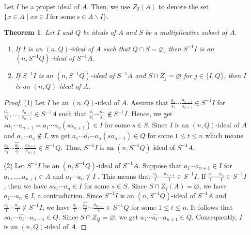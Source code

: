 \documentclass[10pt,a4paper]{amsart}
\newtheorem{theorem}{Theorem}[section]
\numberwithin{equation}{section}
\begin{document}
Let     $I$ be a proper ideal of $A$.  Then, we  use $Z_I(A)$ to denote  the set $\{x \in A \mid xs \in I \  \text{for some} \ s \in A \backslash I\}$.
 \begin{theorem} \label{5}
Let $I$ and $Q$ be ideals of $A$ and $S$ be a multiplicative subset of $A$. 
\begin{enumerate}
\item If $I$ is an $(n,Q)$-ideal of $A$ such that  $Q \cap S=\varnothing$, then $S^{-1}I$ is an $(n,S^{-1}Q)$-ideal of $S^{-1}A$.
\item If $S^{-1}I$ is  an $(n,S^{-1}Q)$-ideal of $S^{-1}A$ and $S \cap Z_j=\varnothing$ for $j \in\{I,Q\}$, then $I$ is an $(n,Q)$-ideal of $A$.
\end{enumerate} 
\end{theorem}
\begin{proof}
(1) Let $I$ be an $(n,Q)$-ideal of $A$. Assume that $  \frac{a
_1}{s_1}\cdots\frac{a_{n+1}}{s_{n+1}} \in S^{-1}I$ for  $ \frac{a
_1}{s_1},\ldots,\frac{a_{n+1}}{s_{n+1}} \in S^{-1}A$ such that $  \frac{a_1}{s_1}\cdots\frac{a_n}{s_n} \notin S^{-1}I$. Hence, we get $ sa_1\cdots a_{n+1}=a_1\cdots a_n(sa_{n+1}) \in I$ for some $s \in S$. Since $I$ is an $(n,Q)$-ideal  of $A$ and $a_1\cdots a_n \notin I$, we get $a_1\cdots \widehat{a_t} \cdots a_n (sa_{n+1})\in Q$ for some $1 \leq t \leq n$ which means  $ \frac{a
_1}{s_1}\cdots \widehat{\frac{a_t}{s_t}} \cdots \frac{a_{n+1}}{s_{n+1}} \in S^{-1}Q$. Thus,  $S^{-1}I$ is an $(n,S^{-1}Q)$-ideal of $S^{-1}A$.

(2) Let  $S^{-1}I$ be an $(n,S^{-1}Q)$-ideal of $S^{-1}A$. Suppose that $  a_1 \cdots a_{n+1} \in I$ for $a_1, \ldots, a_{n+1} \in A$ and $  a_1 \cdots a_n \notin I$ . This means that $\frac{a_1}{1} \cdots \frac{a_{n+1}}{1} \in S^{-1}I$. If $\frac{a_1}{1} \cdots \frac{a_n}{1} \in S^{-1}I$, then we have $sa_1\cdots a_n \in I$ for some $s \in S$. Since  $S \cap Z_I(A)=\varnothing$, we have  $a_1\cdots a_n \in I$, a contradiction. Since $S^{-1}I$ is an $(n,S^{-1}Q)$-ideal of $S^{-1}A$ and $\frac{a_1}{1} \cdots \frac{a_n}{1} \notin S^{-1}I$, we have $\frac{a_1}{1} \cdots \widehat{\frac{a_t}{1}} \cdots  \frac{a_{n+1}}{1} \in S^{-1}Q$ for some $1 \leq t \leq n$. It follows that $sa_1\cdots \widehat{a_t} \cdots a_{n+1} \in Q$. Since $S \cap Z_Q=\varnothing$, we get $a_1\cdots \widehat{a_t} \cdots a_{n+1} \in Q$. Consequently, $I$ is an $(n,Q)$-ideal of $A$.
\end{proof}
\end{document}
